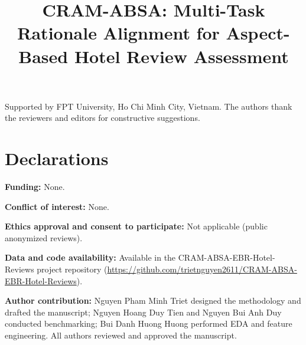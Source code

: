 \documentclass[pdflatex,sn-mathphys-num]{sn-jnl}%
\theoremstyle{thmstyleone}%
\theoremstyle{thmstyletwo}%
\theoremstyle{thmstylethree}%
\begin{document}
\title[CRAM-ABSA for Aspect-Based Hotel Review Assessment]{CRAM-ABSA: Multi-Task Rationale Alignment for Aspect-Based Hotel Review Assessment}



\author*[1,2]{ }

\author[2,3]{ }

\author[1,2]{ }





\backmatter


Supported by FPT University, Ho Chi Minh City, Vietnam. The authors thank the reviewers and editors for constructive suggestions.

\section*{Declarations}

\noindent\textbf{Funding:} None.

\noindent\textbf{Conflict of interest:} None.

\noindent\textbf{Ethics approval and consent to participate:} Not applicable (public anonymized reviews).

\noindent\textbf{Data and code availability:} Available in the CRAM-ABSA-EBR-Hotel-Reviews project repository (\url{https://github.com/trietnguyen2611/CRAM-ABSA-EBR-Hotel-Reviews}).

\noindent\textbf{Author contribution:} Nguyen Pham Minh Triet designed the methodology and drafted the manuscript; Nguyen Hoang Duy Tien and Nguyen Bui Anh Duy conducted benchmarking; Bui Danh Huong Huong performed EDA and feature engineering. All authors reviewed and approved the manuscript.
\end{document}
